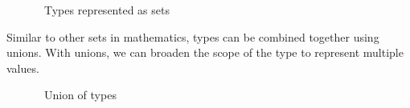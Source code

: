 \begin{figure}
  \centering
  \caption{~Types represented as sets}
\end{figure}

Similar to other sets in mathematics, types can be combined together using unions. With unions, we can broaden the scope of the type to represent multiple values.

\begin{figure}
  \centering
  \caption{~Union of types}
\end{figure}

